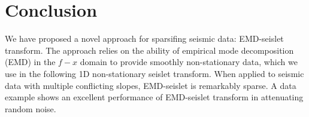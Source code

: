 \section{Conclusion}
We have proposed a novel approach for sparsifing seismic data: EMD-seislet transform. The approach relies on the ability of empirical mode decomposition (EMD) in the $f-x$ domain to provide smoothly non-stationary data, which we use in the following 1D non-stationary seislet transform. When applied to seismic data with multiple conflicting slopes, EMD-seislet is remarkably sparse. A  data example shows an excellent performance of  EMD-seislet transform in attenuating random noise. 



